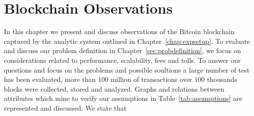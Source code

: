 \documentclass[USenglish]{uit-thesis}
\begin{document}
\chapter{Blockchain Observations}
\label{chap:evaluation}
In this chapter we present and discuss observations of the
Bitcoin blockchain captured by the
analytic system outlined in Chapter~\ref{chap:expsetup}. 
To evaluate and discuss our problem definition in Chapter~\ref{sec:probdefinition},
we focus on considerations related to performance,
scalability, fees and tolls.
To answer our questions and focus on the problems and possible soultions
a large number of test has been evaluated, more than $100$ million
of transactions over $100$ thousands blocks were collected, stored
and analyzed. Graphs and relations between attributes which mine to
verify our assumptions in Table~\ref{tab:assumptions}
are represented and discussed. We state that %




\end{document}
